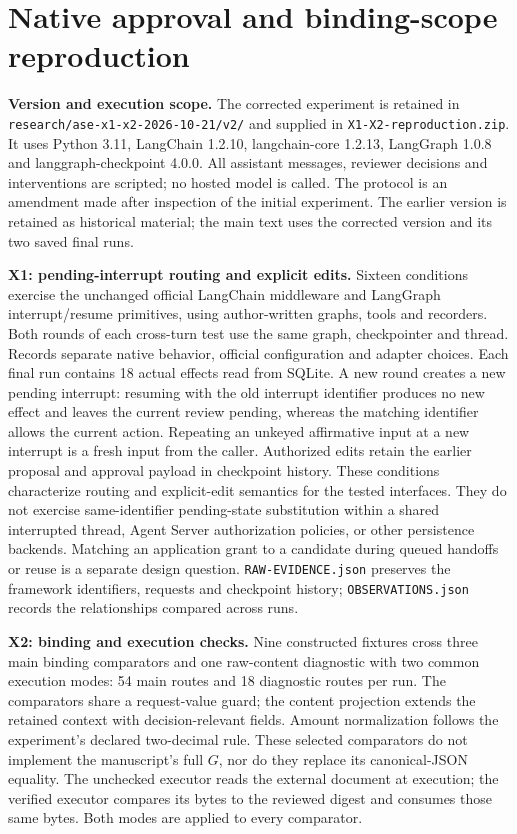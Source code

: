 \section{Native approval and binding-scope reproduction}
\label{sec:a11-native-binding}

\textbf{Version and execution scope.}
The corrected experiment is retained in
\nolinkurl{research/ase-x1-x2-2026-10-21/v2/}
and supplied in \texttt{X1-X2-reproduction.zip}. It uses Python 3.11,
LangChain 1.2.10, langchain-core 1.2.13, LangGraph 1.0.8 and
langgraph-checkpoint 4.0.0. All assistant messages, reviewer decisions
and interventions are scripted; no hosted model is called. The protocol
is an amendment made after inspection of the initial experiment. The
earlier version is retained as historical material; the main text uses
the corrected version and its two saved final runs.

\textbf{X1: pending-interrupt routing and explicit edits.}
Sixteen conditions exercise the unchanged official LangChain middleware
and LangGraph interrupt/resume primitives, using author-written graphs,
tools and recorders. Both rounds of each cross-turn test use the same
graph, checkpointer and thread. Records separate native behavior, official
configuration and adapter choices. Each final run contains 18 actual
effects read from SQLite. A new round creates a new pending interrupt:
resuming with the old interrupt identifier produces no new effect and
leaves the current review pending, whereas the matching identifier
allows the current action. Repeating an unkeyed affirmative input at a
new interrupt is a fresh input from the caller. Authorized edits retain
the earlier proposal and approval payload in checkpoint history.
These conditions characterize routing and explicit-edit semantics for
the tested interfaces. They do not exercise same-identifier pending-state
substitution within a shared interrupted thread, Agent Server
authorization policies, or other persistence backends. Matching an
application grant to a candidate during queued handoffs or reuse is a
separate design question.
\texttt{RAW-EVIDENCE.json} preserves the framework identifiers,
requests and checkpoint history; \texttt{OBSERVATIONS.json} records
the relationships compared across runs.

\textbf{X2: binding and execution checks.}
Nine constructed fixtures cross three main binding comparators and one
raw-content diagnostic with two common execution modes: 54 main routes
and 18 diagnostic routes per run. The comparators share a request-value guard;
the content projection extends the retained context with decision-relevant
fields. Amount normalization follows the experiment's declared two-decimal
rule. These selected comparators do not implement the manuscript's full
$G$, nor do they replace its canonical-JSON equality.
The unchecked executor reads the external document at execution; the
verified executor compares its bytes to the reviewed digest and consumes
those same bytes. Both modes are applied to every comparator.

